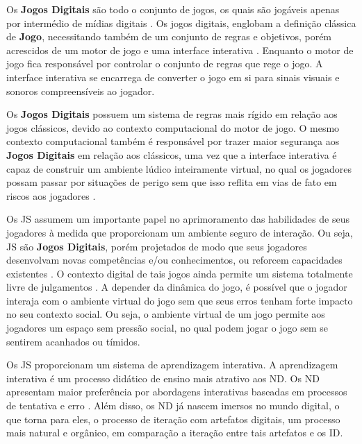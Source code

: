 Os \textbf{Jogos Digitais} são todo o conjunto de jogos, os quais são jogáveis apenas por intermédio de mídias digitais \cite{lucchese2009conceituaccao}. Os jogos digitais, englobam a definição clássica de \textbf{Jogo}, necessitando também de um conjunto de regras e objetivos, porém acrescidos de um motor de jogo e uma interface interativa \cite{battaiola2000jogos}. Enquanto o motor de jogo fica responsável por controlar o conjunto de regras que rege o jogo. A interface interativa se encarrega de converter o jogo em si para sinais visuais e sonoros compreensíveis ao jogador.

Os \textbf{Jogos Digitais}  possuem um sistema de regras mais rígido em relação aos jogos clássicos, devido ao contexto computacional do motor de jogo. O mesmo contexto computacional também é responsável por trazer maior segurança aos \textbf{Jogos Digitais}  em relação aos clássicos, uma vez que a interface interativa é capaz de construir um ambiente lúdico inteiramente virtual, no qual os jogadores possam passar por situações de perigo sem que isso reflita em vias de fato em riscos aos jogadores \cite{lucchese2009conceituaccao}.

Os \ac{JS} assumem um importante papel no aprimoramento das habilidades de seus jogadores à medida que proporcionam um ambiente seguro de interação. Ou seja, \ac{JS} são \textbf{Jogos Digitais}, porém projetados de modo que seus jogadores desenvolvam novas competências e/ou conhecimentos, ou reforcem capacidades existentes \cite{boller2017play}. O contexto digital de tais jogos ainda permite um sistema totalmente livre de julgamentos \cite{unesco2018international}. A depender da dinâmica do jogo, é possível que o jogador interaja com o ambiente virtual do jogo sem que seus erros tenham forte impacto no seu contexto social. Ou seja, o ambiente virtual de um jogo permite aos jogadores um espaço sem pressão social, no qual podem jogar o jogo sem se sentirem acanhados ou tímidos.

Os \ac{JS} proporcionam um sistema de aprendizagem interativa. A aprendizagem interativa é um processo didático de ensino mais atrativo aos \ac{ND}. Os \ac{ND} apresentam maior preferência por abordagens interativas baseadas em processos de tentativa e erro \cite{pescador2010tecnologias}. Além disso, os \ac{ND} já nascem imersos no mundo digital, o que torna para eles, o processo de iteração com artefatos digitais, um processo mais natural e orgânico, em comparação a iteração entre tais artefatos e os \ac{ID}.

